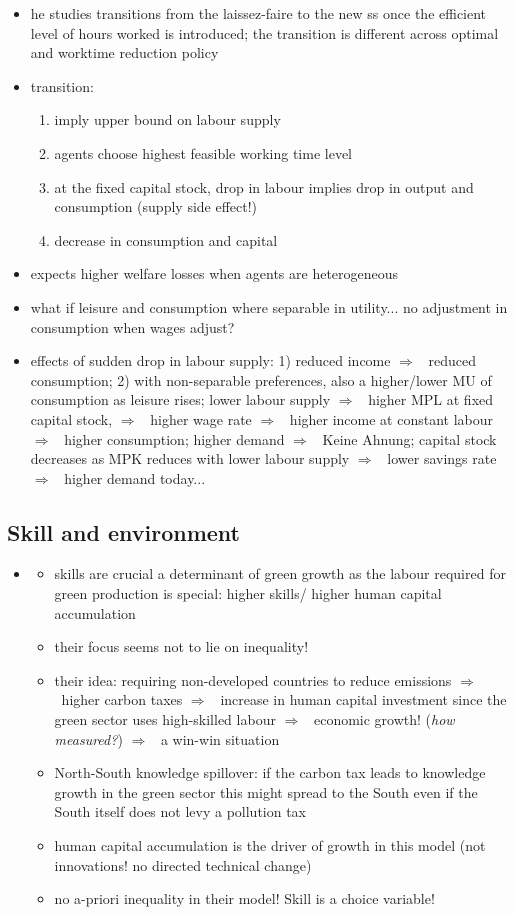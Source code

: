 \documentclass[12pt]{article}
\newcommand{\ar}{$\Rightarrow$ \ }
\begin{document}
\begin{itemize}
\begin{itemize}
\item he studies transitions from the laissez-faire to the new ss once the efficient level of hours worked is introduced; the transition is different across optimal and worktime reduction policy
\item transition:
\begin{enumerate}
\item imply upper bound on labour supply
\item agents choose highest feasible working time level
\item at the fixed capital stock, drop in labour implies drop in output and consumption (supply side effect!)
\item decrease in consumption and capital 
\end{enumerate}
\item expects higher welfare losses when agents are heterogeneous
\item what if leisure and consumption where separable in utility... no adjustment in consumption when wages adjust?
\item effects of sudden drop in labour supply: 1) reduced income \ar reduced consumption; 2) with non-separable preferences, also a higher/lower MU of consumption as leisure rises;
lower labour supply \ar higher MPL at fixed capital stock, \ar higher wage rate \ar higher income at constant labour \ar higher consumption;
higher demand \ar Keine Ahnung;
capital stock decreases as MPK reduces with lower labour supply \ar lower savings rate\ar higher demand today... 
\end{itemize}
\end{itemize}

\subsection{Skill and environment}
\begin{itemize}
\item \cite{Borissov2019CarbonDevelopment}
\begin{itemize}
\item skills are crucial a determinant of green growth as the labour required for green production is special: higher skills/ higher human capital accumulation
\item their focus seems not to lie on inequality!
\item their idea: requiring non-developed countries to reduce emissions \ar higher carbon taxes \ar increase in human capital investment since the green sector uses high-skilled labour \ar economic growth! (\textit{how measured?}) \ar a win-win situation
\item North-South knowledge spillover: if the carbon tax leads to knowledge growth in the green sector this might spread to the South even if the South itself does not levy a pollution tax
\item human capital accumulation is the driver of growth in this model (not innovations! no directed technical change)
\item no a-priori inequality in their model! Skill is a choice variable! 
\end{itemize}
\end{itemize}
\end{document}
